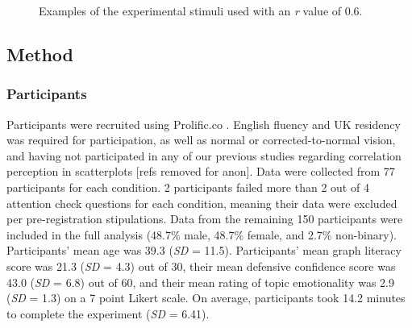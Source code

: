 \documentclass[manuscript,screen,review,anonymous]{acmart}
\begin{document}
\begin{figure}


\caption{\label{fig-main-examples}Examples of the experimental stimuli
used with an \textit{r} value of 0.6.}

\end{figure}%

\subsection{Method}\label{sec-method-main}

\subsubsection{Participants}\label{sec-participants-main}

Participants were recruited using Prolific.co \citep{prolific}. English
fluency and UK residency was required for participation, as well as
normal or corrected-to-normal vision, and having not participated in any
of our previous studies regarding correlation perception in scatterplots
{[}refs removed for anon{]}. Data were collected from 77 participants
for each condition. 2 participants failed more than 2 out of 4 attention
check questions for each condition, meaning their data were excluded per
pre-registration stipulations. Data from the remaining 150 participants
were included in the full analysis (48.7\% male, 48.7\% female, and
2.7\% non-binary). Participants' mean age was 39.3 (\emph{SD} = 11.5).
Participants' mean graph literacy score was 21.3 (\emph{SD} = 4.3) out
of 30, their mean defensive confidence score was 43.0 (\emph{SD} = 6.8)
out of 60, and their mean rating of topic emotionality was 2.9
(\emph{SD} = 1.3) on a 7 point Likert scale. On average, participants
took 14.2 minutes to complete the experiment (\emph{SD} = 6.41).
\end{document}
